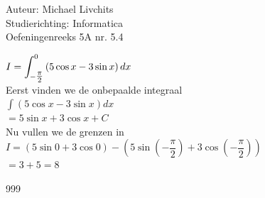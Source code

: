 \documentclass[a4paper]{article}
\newcommand{\dint}{\displaystyle\int}
\begin{document}
  
\noindent \large Auteur: Michael Livchits \\
\noindent \large Studierichting: Informatica\\
\noindent \large Oefeningenreeks 5A nr. 5.4\\

\medskip

\normalsize

$I = \displaystyle\dint_{-\tfrac{\pi}{2}}^0 \left(5\cos x-3\sin x\right)dx$\\

Eerst vinden we de onbepaalde integraal\\

$\displaystyle\int \left(5\cos x-3\sin x\right)dx$\\

$ = 5\sin x + 3 \cos x + C$\\

Nu vullen we de grenzen in\\

$I = \left(5\sin 0 + 3 \cos 0\right) - \left(5\sin\left(-\dfrac{\pi}{2}\right)+3\cos\left(-\dfrac{\pi}{2}\right)\right)$\\

$= 3+5 = 8$\\

\begin{thebibliography}{999}
\end{thebibliography}
\end{document}
